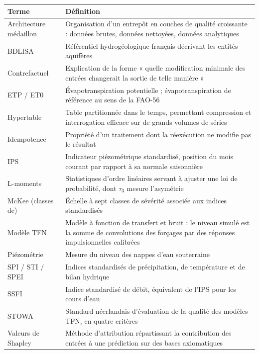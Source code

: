 \begin{center}
\begin{tabularx}{\textwidth}{@{}lX@{}}
\toprule
\textbf{Terme} & \textbf{Définition} \\
\midrule
Architecture médaillon & Organisation d'un entrepôt en couches de qualité croissante : données
brutes, données nettoyées, données analytiques \\
BDLISA & Référentiel hydrogéologique français décrivant les entités aquifères \\
Contrefactuel & Explication de la forme « quelle modification minimale des entrées changerait
la sortie de telle manière » \\
ETP / ET0 & Évapotranspiration potentielle ; évapotranspiration de référence au sens de la
FAO-56 \\
Hypertable & Table partitionnée dans le temps, permettant compression et interrogation efficace
sur de grands volumes de séries \\
Idempotence & Propriété d'un traitement dont la réexécution ne modifie pas le résultat \\
IPS & Indicateur piézométrique standardisé, position du mois courant par rapport à sa normale
saisonnière \\
L-moments & Statistiques d'ordre linéaires servant à ajuster une loi de probabilité, dont
$\tau_3$ mesure l'asymétrie \\
McKee (classes de) & Échelle à sept classes de sévérité associée aux indices standardisés \\
Modèle TFN & Modèle à fonction de transfert et bruit : le niveau simulé est la somme de
convolutions des forçages par des réponses impulsionnelles calibrées \\
Piézométrie & Mesure du niveau des nappes d'eau souterraine \\
SPI / STI / SPEI & Indices standardisés de précipitation, de température et de bilan hydrique \\
SSFI & Indice standardisé de débit, équivalent de l'IPS pour les cours d'eau \\
STOWA & Standard néerlandais d'évaluation de la qualité des modèles TFN, en quatre critères \\
Valeurs de Shapley & Méthode d'attribution répartissant la contribution des entrées à une
prédiction sur des bases axiomatiques \\
\bottomrule
\end{tabularx}
\end{center}

